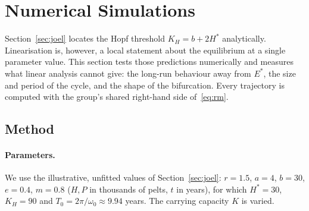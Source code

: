 
\section{Numerical Simulations}\label{sec:rishi}

Section~\ref{sec:joel} locates the Hopf threshold $K_H=b+2H^*$ analytically. Linearisation is,
however, a local statement about the equilibrium at a single parameter value. This section tests
those predictions numerically and measures what linear analysis cannot give: the long-run
behaviour away from $E^*$, the size and period of the cycle, and the shape of the bifurcation.
Every trajectory is computed with the group's shared right-hand side of~\eqref{eq:rm}.

\subsection{Method}

\paragraph{Parameters.} We use the illustrative, unfitted values of Section~\ref{sec:joel}:
$r=1.5$, $a=4$, $b=30$, $e=0.4$, $m=0.8$ ($H,P$ in thousands of pelts, $t$ in years), for which
$H^*=30$, $K_H=90$ and $T_0=2\pi/\omega_0\approx 9.94$ years. The carrying capacity $K$ is varied.

